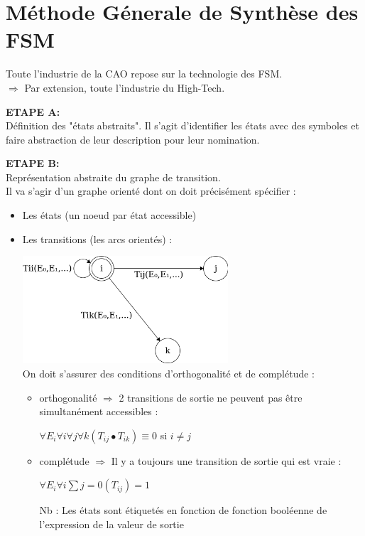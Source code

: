 \section{Méthode Génerale de Synthèse des FSM}
Toute l'industrie de la CAO repose sur la technologie des FSM. \\
$\Rightarrow$ Par extension, toute l'industrie du High-Tech.

{\bf ETAPE A:}\\
Définition des "états abstraits".
Il s'agit d'identifier les états avec des symboles et faire abstraction de leur
description pour leur nomination.

{\bf ETAPE B:}\\
Représentation abstraite du graphe de transition.\\
Il va s'agir d'un graphe orienté dont on doit précisément spécifier :
\begin{itemize}
  \item Les états (un noeud par état accessible)
  \item Les transitions (les arcs orientés) :
  \begin{center}
    \includegraphics[height=4cm]{cours1/pics/graph1.png}
    \\On doit s'assurer des conditions d'orthogonalité et de complétude :
    \begin{itemize}
      \item orthogonalité $\Rightarrow$ 2 transitions de sortie ne peuvent pas
      être simultanément accessibles :\\
      \begin{center}
        \(\forall E_i \forall i \forall j \forall k{(T_{ij} \bullet T_{ik})} \equiv 0\) si
        $i \ne j$
      \end{center}
      \item complétude $\Rightarrow$ Il y a toujours une transition de sortie
      qui est vraie : \\
      \begin{center}
        \(\forall E_i \forall i \sum{j=0}{(T_{ij})} = 1\)
      \end{center}
      Nb : Les états sont étiquetés en fonction de fonction booléenne de l'expression
      de la valeur de sortie
    \end{itemize}
  \end{center}
\end{itemize}

